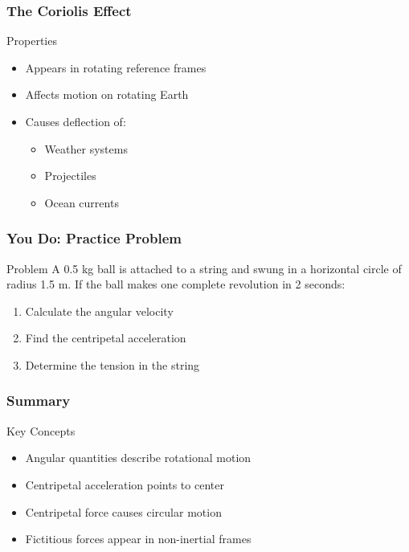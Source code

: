 \documentclass{beamer}
\begin{document}
\begin{frame}
\frametitle{The Coriolis Effect}
\begin{block}{Properties}
\begin{itemize}
\item Appears in rotating reference frames
\item Affects motion on rotating Earth
\item Causes deflection of:
  \begin{itemize}
  \item Weather systems
  \item Projectiles
  \item Ocean currents
  \end{itemize}
\end{itemize}
\end{block}
\end{frame}

\begin{frame}
\frametitle{You Do: Practice Problem}
\begin{block}{Problem}
A 0.5 kg ball is attached to a string and swung in a horizontal circle of radius 1.5 m.
If the ball makes one complete revolution in 2 seconds:
\begin{enumerate}
\item Calculate the angular velocity
\item Find the centripetal acceleration
\item Determine the tension in the string
\end{enumerate}
\end{block}
\end{frame}

\begin{frame}
\frametitle{Summary}
\begin{block}{Key Concepts}
\begin{itemize}
\item Angular quantities describe rotational motion
\item Centripetal acceleration points to center
\item Centripetal force causes circular motion
\item Fictitious forces appear in non-inertial frames
\end{itemize}
\end{block}
\end{frame}
\end{document}

